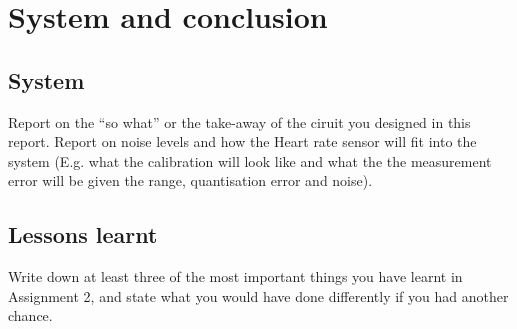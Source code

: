 \chapter{System and conclusion}
\vspace{-5mm}
\section{System}
Report on the ``so what'' or the take-away of the ciruit you designed in this report.  
Report on noise levels and how the Heart rate sensor will fit into the system (E.g. what the calibration will look like and what the the measurement error will be given the range, quantisation error and noise). 

\section{Lessons learnt}
Write down at least three of the most important things you have learnt in Assignment 2, and state what you would have done differently if you had another chance. 
